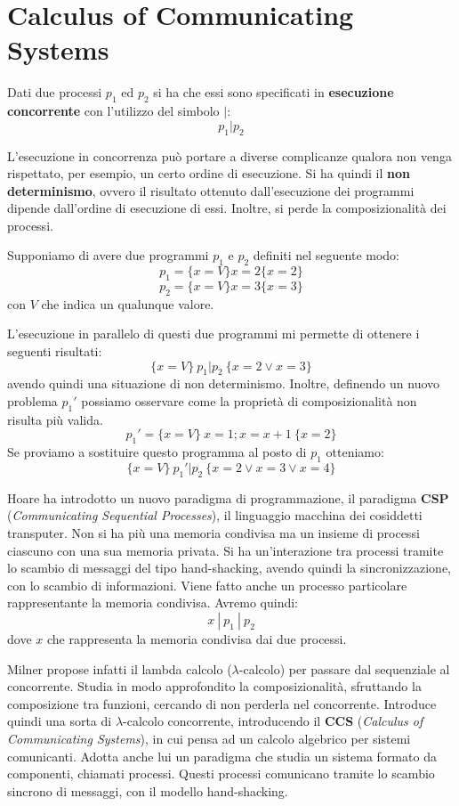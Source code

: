 \chapter{Calculus of Communicating Systems}
Dati due processi $p_1$ ed $p_2$ si ha che essi sono specificati in \textbf{esecuzione concorrente} con l'utilizzo del simbolo $|$:
$$p_1 | p_2$$

L'esecuzione in concorrenza può portare a diverse complicanze qualora non venga rispettato, per esempio, un certo ordine di esecuzione. Si ha quindi il \textbf{non determinismo}, ovvero il risultato ottenuto dall'esecuzione dei programmi dipende dall'ordine di esecuzione di essi. Inoltre, si perde la composizionalità dei processi.
\begin{esempio}
    Supponiamo di avere due programmi $p_1$ e $p_2$ definiti nel seguente modo: $$p_1 =\{x = V\} x = 2 \{x = 2\}$$ $$p_2 =\{x = V\} x = 3 \{x = 3\}$$ con $V$ che indica un qualunque valore.

    L'esecuzione in parallelo di questi due programmi mi permette di ottenere i seguenti risultati: $$ \{x = V\} \ p_1 | p_2 \ \{x = 2 \lor x = 3\}$$ avendo quindi una situazione di non determinismo. Inoltre, definendo un nuovo problema $p_1'$ possiamo osservare come la proprietà di composizionalità non risulta più valida. $$p_1' = \{x = V\} \ x = 1; x = x + 1 \ \{x = 2\}$$ Se proviamo a sostituire questo programma al posto di $p_1$ otteniamo: $$ \{x = V\} \ p_1' | p_2 \ \{x = 2 \lor x = 3 \lor x = 4\}$$
\end{esempio}

Hoare ha introdotto un nuovo paradigma di programmazione, il paradigma \textbf{CSP} (\textit{Communicating Sequential Processes}), il linguaggio macchina dei cosiddetti transputer. Non si ha più una memoria condivisa ma un insieme di processi ciascuno con una sua memoria privata. Si ha un'interazione tra processi tramite lo scambio di messaggi del tipo hand-shacking, avendo quindi la sincronizzazione, con lo scambio di informazioni. Viene fatto anche un processo particolare rappresentante la memoria condivisa. Avremo quindi: $$x \ | \ p_1 \ | \ p_2$$ dove $x$ che rappresenta la memoria condivisa dai due processi.

Milner propose infatti il lambda calcolo ($\lambda$-calcolo) per passare dal sequenziale al concorrente. Studia in modo approfondito la composizionalità, sfruttando la composizione tra funzioni, cercando di non perderla nel concorrente. Introduce quindi una sorta di $\lambda$-calcolo concorrente, introducendo il \textbf{CCS} (\textit{Calculus of Communicating Systems}), in cui pensa ad un calcolo algebrico per sistemi comunicanti. Adotta anche lui un paradigma che studia un sistema formato da componenti, chiamati processi. Questi processi comunicano tramite lo scambio sincrono di messaggi, con il modello hand-shacking.

